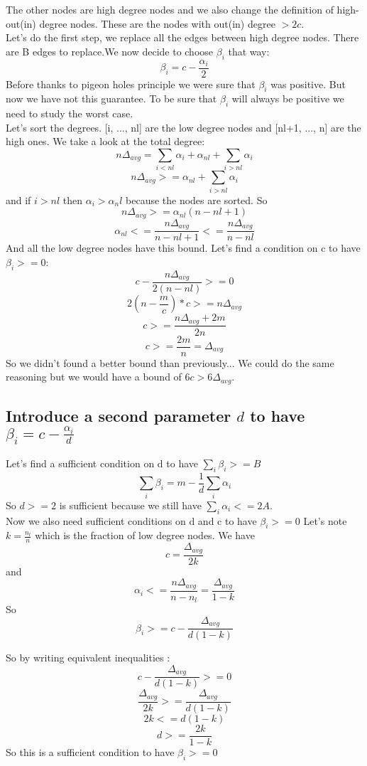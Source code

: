 \documentclass{article}
\begin{document}
The other nodes are high degree nodes and we also change the definition
of high-out(in) degree nodes. These are the nodes with out(in)
degree $> 2c$.\\

Let's do the first step, we replace all the edges between high degree nodes.
There are B edges to replace.We now decide to choose $\beta_i$
that way: $$\beta_i = c - \frac{\alpha_i}{2}$$
Before thanks to pigeon holes principle we were sure that $\beta_i$
was positive. But now we have not this guarantee. To be sure that
$\beta_i$ will always be positive we need to study the worst case.\\

Let's sort the degrees. [i, ..., nl] are the low degree nodes and
[nl+1, ..., n] are the high ones. We take a look at the total degree:
$$n\Delta_{avg} = \sum_{i < nl} \alpha_i + \alpha_{nl} + \sum_{i > nl} \alpha_i$$
$$n\Delta_{avg} >= \alpha_{nl} + \sum_{i > nl} \alpha_i$$
and if $i > nl$ then $\alpha_i > \alpha_nl$ because the nodes are sorted. So
$$n\Delta_{avg} >= \alpha_{nl}(n-nl+1)$$
$$\alpha_{nl} <= \frac{n\Delta_{avg}}{n-nl+1} <= \frac{n\Delta_{avg}}{n-nl}$$
And all the low degree nodes have this bound.
Let's find a condition on c to have $\beta_i >= 0$:
$$c - \frac{n\Delta_{avg}}{2(n-nl)} >= 0$$
$$2(n-\frac{m}{c})*c >= n\Delta_{avg}$$
$$c >= \frac{n\Delta_{avg}+2m}{2n}$$
$$c >= \frac{2m}{n} = \Delta_{avg}$$
So we didn't found a better bound than previously...
We could do the same reasoning but we would have a bound of $6c > 6\Delta_{avg}$.

\subsection{Introduce a second parameter $d$ to have $\beta_i=c-\frac{\alpha_i}{d}$}

Let's find a sufficient condition on d to have $\sum_{i} \beta_i >= B$
$$\sum_{i} \beta_i = m - \frac{1}{d}\sum_{i} \alpha_i$$
So $d >= 2$ is sufficient because we still have $\sum_{i} \alpha_i <= 2A$.\\

Now we also need sufficient conditions on d and c to have $\beta_i >= 0$
Let's note $k = \frac{n_l}{n}$ which is the fraction of low degree nodes.
We have $$c = \frac{\Delta_{avg}}{2k}$$
and $$\alpha_i <= \frac{n\Delta_{avg}}{n-n_l} = \frac{\Delta_{avg}}{1-k}$$
So $$\beta_i >= c - \frac{\Delta_{avg}}{d(1-k)}$$

So by writing equivalent inequalities :
$$c - \frac{\Delta_{avg}}{d(1-k)} >= 0$$
$$\frac{\Delta_{avg}}{2k} >= \frac{\Delta_{avg}}{d(1-k)}$$
$$2k <= d(1-k)$$
$$d >= \frac{2k}{1-k}$$
So this is a sufficient condition to have $\beta_i >= 0$\\
\end{document}
